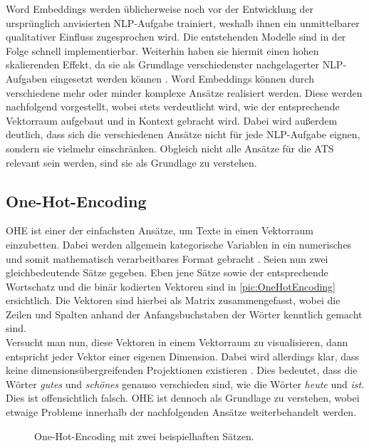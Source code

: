 \noindent
Word Embeddings werden üblicherweise noch vor der Entwicklung der ursprünglich anvisierten \ac{NLP}-Aufgabe trainiert, weshalb ihnen ein unmittelbarer qualitativer Einfluss zugesprochen wird. Die entstehenden Modelle sind in der Folge schnell implementierbar. Weiterhin haben sie hiermit einen hohen skalierenden Effekt, da sie als Grundlage verschiedenster nachgelagerter \ac{NLP}-Aufgaben eingesetzt werden können \cite{NIT19}. Word Embeddings können durch verschiedene mehr oder minder komplexe Ansätze realisiert werden. Diese werden nachfolgend vorgestellt, wobei stets verdeutlicht wird, wie der entsprechende Vektorraum aufgebaut und in Kontext gebracht wird. Dabei wird außerdem deutlich, dass sich die verschiedenen Ansätze nicht für jede \ac{NLP}-Aufgabe eignen, sondern sie vielmehr einschränken. Obgleich nicht alle Ansätze für die \ac{ATS} relevant sein werden, sind sie als Grundlage zu verstehen.
\newpage


\subsection{One-Hot-Encoding}
\noindent
\ac{OHE} ist einer der einfachsten Ansätze, um Texte in einen Vektorraum einzubetten. Dabei werden allgemein kategorische Variablen in ein numerisches und somit mathematisch verarbeitbares Format gebracht \cite{KAR18}. Seien nun zwei gleichbedeutende Sätze gegeben. Eben jene Sätze sowie der entsprechende Wortschatz und die binär kodierten Vektoren sind in \autoref{pic:OneHotEncoding} ersichtlich. Die Vektoren sind hierbei als Matrix zusammengefasst, wobei die Zeilen und Spalten anhand der Anfangsbuchstaben der Wörter kenntlich gemacht sind.\\

\noindent
Versucht man nun, diese Vektoren in einem Vektorraum zu visualisieren, dann entspricht jeder Vektor einer eigenen Dimension. Dabei wird allerdings klar, dass keine dimensionsübergreifenden Projektionen existieren \cite{KAR18}. Dies bedeutet, dass die Wörter \textit{gutes} und \textit{schönes} genauso verschieden sind, wie die Wörter \textit{heute} und \textit{ist}. Dies ist offensichtlich falsch. \ac{OHE} ist dennoch als Grundlage zu verstehen, wobei etwaige Probleme innerhalb der nachfolgenden Ansätze weiterbehandelt werden.\\

\begin{figure}[h!]
  \centering
  \caption{One-Hot-Encoding mit zwei beispielhaften Sätzen.}
  \label{pic:OneHotEncoding}
\end{figure}



